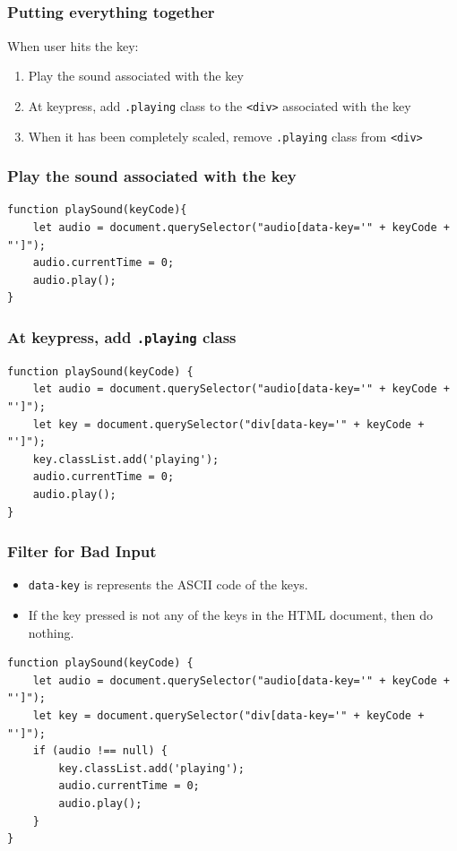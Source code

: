\documentclass[handout,12pt]{beamer}
\begin{document}
\subsection{}
\begin{frame}
	\frametitle{Putting everything together}
	When user hits the key:
	\begin{enumerate}
		\item Play the sound associated with the key
		\item At keypress, add \texttt{.playing} class to the \texttt{<div>} associated with the key
		\item When it has been completely scaled, remove \texttt{.playing} class from \texttt{<div>}
	\end{enumerate}
\end{frame}

\begin{frame}[fragile]
	\frametitle{{Play the sound associated with the key}}
	\begin{verbatim}
function playSound(keyCode){
	let audio = document.querySelector("audio[data-key='" + keyCode + "']");
	audio.currentTime = 0;
	audio.play();
}
	\end{verbatim}
\end{frame}

\begin{frame}[fragile]
	\frametitle{At keypress, add \texttt{.playing} class}
	\begin{verbatim}
function playSound(keyCode) {
	let audio = document.querySelector("audio[data-key='" + keyCode + "']");
	let key = document.querySelector("div[data-key='" + keyCode + "']");
	key.classList.add('playing');
	audio.currentTime = 0;
	audio.play();
}
\end{verbatim}
\end{frame}

\begin{frame}[fragile]
	\frametitle{Filter for Bad Input}
	\begin{itemize}
		\item \texttt{data-key} is represents the ASCII code of the keys.
		\item If the key pressed is not any of the keys in the HTML document, then do nothing.
	\end{itemize}
		\begin{verbatim}
function playSound(keyCode) {
	let audio = document.querySelector("audio[data-key='" + keyCode + "']");
	let key = document.querySelector("div[data-key='" + keyCode + "']");
	if (audio !== null) {
		key.classList.add('playing');
		audio.currentTime = 0;
		audio.play();
	}
}
		\end{verbatim}
\end{frame}
\end{document}
